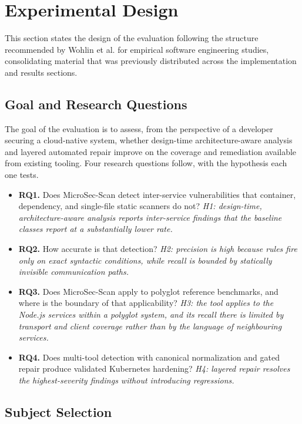 \documentclass[preprint,12pt]{elsarticle}
\newcommand{\new}[1]{#1}
\begin{document}
\new{\section{Experimental Design}}
\label{sec:expdesign}

\new{This section states the design of the evaluation following the
structure recommended by Wohlin et al. for empirical software engineering
studies, consolidating material that was previously distributed across the
implementation and results sections.}

\new{\subsection{Goal and Research Questions}}

\new{The goal of the evaluation is to assess, from the perspective of a
developer securing a cloud-native system, whether design-time
architecture-aware analysis and layered automated repair improve on the
coverage and remediation available from existing tooling. Four research
questions follow, with the hypothesis each one tests.}

\new{
\begin{itemize}
\item \textbf{RQ1.} Does MicroSec-Scan detect inter-service vulnerabilities
that container, dependency, and single-file static scanners do not?
\emph{H1: design-time, architecture-aware analysis reports inter-service
findings that the baseline classes report at a substantially lower rate.}
\item \textbf{RQ2.} How accurate is that detection? \emph{H2: precision is
high because rules fire only on exact syntactic conditions, while recall is
bounded by statically invisible communication paths.}
\item \textbf{RQ3.} Does MicroSec-Scan apply to polyglot reference
benchmarks, and where is the boundary of that applicability?
\emph{H3: the tool applies to the Node.js services within a polyglot system,
and its recall there is limited by transport and client coverage rather than
by the language of neighbouring services.}
\item \textbf{RQ4.} Does multi-tool detection with canonical normalization
and gated repair produce validated Kubernetes hardening? \emph{H4: layered
repair resolves the highest-severity findings without introducing
regressions.}
\end{itemize}
}

\new{\subsection{Subject Selection}}
\end{document}

